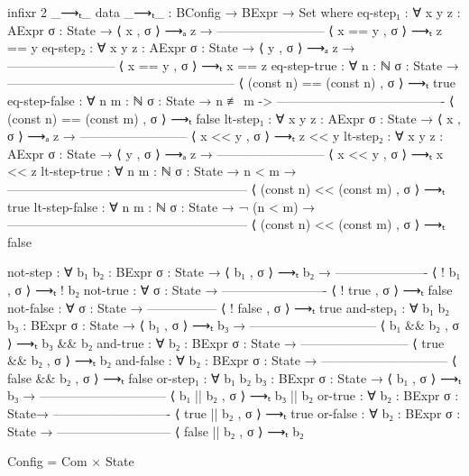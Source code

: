 \documentclass{lecturenotes}
\begin{document}
\begin{code}
infixr 2 _⟶ₜ_
data _⟶ₜ_ : BConfig → BExpr → Set where
  eq-step₁ : ∀ {x y z : AExpr} {σ : State} →
          ⟨ x , σ ⟩ ⟶ₐ z → 
    --------------------------
     ⟨ x == y , σ ⟩ ⟶ₜ z == y
  eq-step₂ : ∀ {x y z : AExpr} {σ : State} →
          ⟨ y , σ ⟩ ⟶ₐ z →
    --------------------------
     ⟨ x == y , σ ⟩ ⟶ₜ x == z
  eq-step-true : ∀ {n : ℕ} {σ : State} →
    ------------------------------------------------------
     ⟨ (const n) == (const n) , σ ⟩ ⟶ₜ true
  eq-step-false : ∀ {n m : ℕ} {σ : State} →
                    n ≢ m ->
    ----------------------------------------
    ⟨ (const n) == (const m) , σ ⟩ ⟶ₜ false
  lt-step₁ : ∀ {x y z : AExpr} {σ : State} →
          ⟨ x , σ ⟩ ⟶ₐ z →
    --------------------------
     ⟨ x << y , σ ⟩ ⟶ₜ z << y 
  lt-step₂ : ∀ {x y z : AExpr} {σ : State} →
          ⟨ y , σ ⟩ ⟶ₐ z →
    --------------------------
     ⟨ x << y , σ ⟩ ⟶ₜ x << z
  lt-step-true : ∀ {n m : ℕ} {σ : State} →
                                  n < m →
    ---------------------------------------------------------
     ⟨ (const n) << (const m) , σ ⟩ ⟶ₜ true
  lt-step-false : ∀ {n m : ℕ} {σ : State} →
                                 ¬ (n < m) → 
    ---------------------------------------------------------
     ⟨ (const n) << (const m) , σ ⟩ ⟶ₜ false

  not-step : ∀ {b₁ b₂ : BExpr} {σ : State} →
       ⟨ b₁ , σ ⟩ ⟶ₜ b₂ →
    ----------------------
     ⟨ ! b₁ , σ ⟩ ⟶ₜ ! b₂
  not-true : ∀ {σ : State} →
    -------------------------
     ⟨ ! true , σ ⟩ ⟶ₜ false
  not-false : ∀ {σ : State} → 
    -----------------
     ⟨ ! false , σ ⟩ ⟶ₜ true
  and-step₁ : ∀ {b₁ b₂ b₃ : BExpr} {σ : State} →
           ⟨ b₁ , σ ⟩ ⟶ₜ b₃ →
    ------------------------------
     ⟨ b₁ && b₂ , σ ⟩ ⟶ₜ b₃ && b₂
  and-true : ∀ {b₂ : BExpr} {σ : State} →
    --------------------------
     ⟨ true && b₂ , σ ⟩ ⟶ₜ b₂
  and-false : ∀ {b₂ : BExpr} {σ : State} →
    ------------------------------
     ⟨ false && b₂ , σ ⟩ ⟶ₜ false
  or-step₁ : ∀ {b₁ b₂ b₃ : BExpr} {σ : State} →
           ⟨ b₁ , σ ⟩ ⟶ₜ b₃ →
    ------------------------------
     ⟨ b₁ || b₂ , σ ⟩ ⟶ₜ b₃ || b₂
  or-true : ∀ {b₂ : BExpr} {σ : State}→
    ----------------------------
     ⟨ true || b₂ , σ ⟩ ⟶ₜ true
  or-false : ∀ {b₂ : BExpr} {σ : State} →
    ---------------------------
     ⟨ false || b₂ , σ ⟩ ⟶ₜ b₂

Config = Com × State


\end{code}
\end{document}
